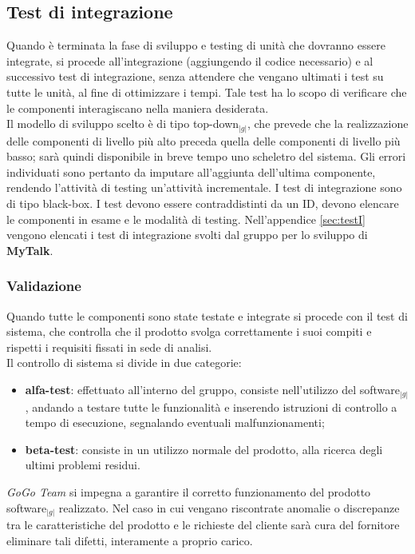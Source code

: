 {{	\subsection{Test di integrazione}{
		Quando è terminata la fase di sviluppo e testing di unità che dovranno essere integrate, si procede all'integrazione 
		(aggiungendo il codice necessario) e al successivo test di integrazione, senza attendere che vengano ultimati i test su
		tutte le unità, al fine di ottimizzare i tempi. Tale test ha lo scopo di verificare che le componenti interagiscano 
		nella maniera desiderata.\\
		Il modello di sviluppo scelto è di tipo top-down$_{|g|}$, che prevede che la realizzazione delle componenti di livello 
		più alto preceda quella delle componenti di livello più basso; sarà quindi disponibile in breve tempo uno scheletro del 
		sistema. Gli errori individuati sono pertanto da imputare all'aggiunta dell'ultima componente, rendendo l'attività di 
		testing un'attività incrementale. I test di integrazione sono di tipo black-box. 
		I test devono essere contraddistinti da un ID, devono elencare le componenti in esame e le modalità di testing.
		Nell'appendice \ref{sec:testI} vengono elencati i test di integrazione svolti dal gruppo per lo sviluppo di \textbf{MyTalk}.
	}
	\subsubsection{Validazione}{
		
		Quando tutte le componenti sono state testate e integrate si procede con il test di sistema, che controlla che il prodotto
		svolga correttamente i suoi compiti e rispetti i requisiti fissati in sede di analisi.\\
		Il controllo di sistema si divide in due categorie:
		\begin{itemize}
			\item \textbf{alfa-test}: effettuato all'interno del gruppo, consiste nell'utilizzo del software$_{|g|}$, 
			      andando a testare	tutte le funzionalità e inserendo istruzioni di controllo a tempo di esecuzione, 
			      segnalando eventuali malfunzionamenti;
			\item \textbf{beta-test}: consiste in un utilizzo normale del prodotto, alla ricerca degli ultimi problemi residui.
		\end{itemize}
		\textit{GoGo Team} si impegna a garantire il corretto funzionamento del prodotto software$_{|g|}$ realizzato. 
		Nel caso in cui vengano riscontrate anomalie o discrepanze tra le caratteristiche del prodotto e le richieste del cliente 
		sarà cura del fornitore eliminare tali difetti, interamente a proprio carico.
	}
    }
    
}
